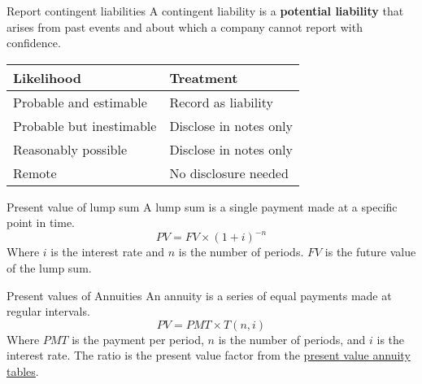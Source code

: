 \begin{theorem}
    {Report contingent liabilities}
    A contingent liability is a \textbf{potential liability} that arises from past events and about which a company cannot report with confidence.

    \begin{tabular}{|p{}|p{}|}
        \hline
        \textbf{Likelihood}      & \textbf{Treatment}     \\
        \hline
        Probable and estimable   & Record as liability    \\
        \hline
        Probable but inestimable & Disclose in notes only \\
        \hline
        Reasonably possible      & Disclose in notes only \\
        \hline
        Remote                   & No disclosure needed   \\
        \hline
    \end{tabular}
\end{theorem}

\begin{theorem}
    {Present value of lump sum}
    A lump sum is a single payment made at a specific point in time.
    \[PV = FV \times (1+i)^{-n}\]
    Where $i$ is the interest rate and $n$ is the number of periods. $FV$ is the future value of the lump sum.
\end{theorem}

\begin{theorem}
    {Present values of Annuities}
    An annuity is a series of equal payments made at regular intervals.
    \[PV = PMT \times T(n, i)\]
    Where $PMT$ is the payment per period,
    $n$ is the number of periods, and
    $i$ is the interest rate.
    The ratio is the present value factor from the \href{https://www.double-entry-bookkeeping.com/wp-content/uploads/present-value-annuity-tables-v-1.0.jpg}{present value annuity tables}.
\end{theorem}
